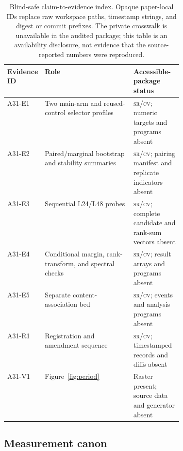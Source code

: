 \documentclass{article}
\newcommand{\srcv}{\textsc{sr/cv}}
\begin{document}
\begin{table}[H]
\centering
\footnotesize
\setlength{\tabcolsep}{3pt}
\begin{tabularx}{\linewidth}{@{}>{\raggedright\arraybackslash}p{0.13\linewidth}
  >{\raggedright\arraybackslash}X
  >{\raggedright\arraybackslash}p{0.29\linewidth}@{}}
\toprule
Evidence ID & Role & Accessible-package status \\
\midrule
A31-E1 & Two main-arm and reused-control selector profiles & \srcv; numeric targets and programs absent \\
A31-E2 & Paired/marginal bootstrap and stability summaries & \srcv; pairing manifest and replicate indicators absent \\
A31-E3 & Sequential L24/L48 probes & \srcv; complete candidate and rank-sum vectors absent \\
A31-E4 & Conditional margin, rank-transform, and spectral checks & \srcv; result arrays and programs absent \\
A31-E5 & Separate content-association bed & \srcv; events and analysis programs absent \\
A31-R1 & Registration and amendment sequence & \srcv; timestamped records and diffs absent \\
A31-V1 & Figure~\ref{fig:period} & Raster present; source data and generator absent \\
\bottomrule
\end{tabularx}
\caption{Blind-safe claim-to-evidence index. Opaque paper-local IDs replace raw
workspace paths, timestamp strings, and digest or commit prefixes. The private
crosswalk is unavailable in the audited package; this table is an availability
disclosure, not evidence that the source-reported numbers were reproduced.}
\label{tab:artifacts}
\end{table}

\subsection{Measurement canon}\label{sec:canon}
\end{document}
